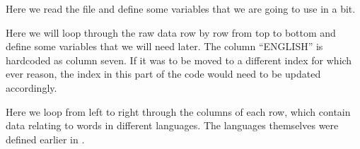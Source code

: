 \documentclass[letterpaper,10pt,english]{sphinxmanual}
\begin{document}
\begin{sphinxVerbatim}[commandchars=\\\{\}]
  
     
  \PYG{p}{[}\PYG{p}{]}
  
  
  
\end{sphinxVerbatim}

\sphinxAtStartPar
Here we read the file  and define some variables that we are
going to use in a bit.

\begin{sphinxVerbatim}[commandchars=\\\{\}]
    
       \PYG{p}{[}\PYG{p}{]}
      \PYG{p}{[}\PYG{p}{]}\PYG{p}{[}\PYG{p}{]}
      
\end{sphinxVerbatim}

\sphinxAtStartPar
Here we will loop through the raw data  row by row from top to
bottom and define some variables that we will need later. The column “ENGLISH”
is hard\sphinxhyphen{}coded as column seven. If it was to be moved to a different index for
which ever reason, the index in this part of the code would need to be updated
accordingly.

\begin{sphinxVerbatim}[commandchars=\\\{\}]
   
\end{sphinxVerbatim}

\sphinxAtStartPar
Here we loop from left to right through the columns of each row, which contain
data relating to words in different languages. The languages themselves were
defined earlier in .
\end{document}
